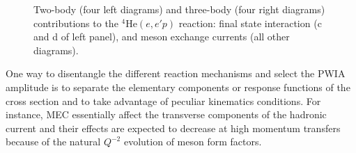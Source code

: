 \documentclass{elsart}
\begin{document}
\vspace*{1pt}
\begin{figure}[h]

\vspace*{-133.5pt}

\caption{Two-body (four left diagrams) and three-body (four right diagrams) 
contributions to the $^4$He$(e,e'p)$ reaction: final state interaction (c and d 
of left panel), and meson exchange currents (all other diagrams).}

\label{2-3body}
\end{figure}

One way to disentangle the different reaction mechanisms 
and select the PWIA amplitude is to separate the elementary components or 
response
functions of the cross section and to take advantage of peculiar kinematics
conditions. For instance, MEC essentially affect the transverse components of 
the hadronic current and their effects are expected to decrease at high 
momentum transfers because of the natural $Q^{-2}$ evolution of meson form 
factors. 
\end{document}
